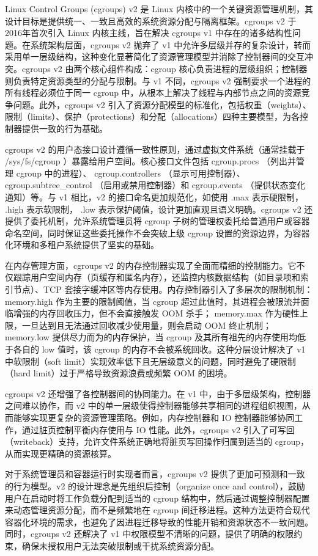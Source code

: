 Linux Control Groups (cgroups) v2 是 Linux 内核中的一个关键资源管理机制，其设计目标是提供统一、一致且高效的系统资源分配与隔离框架。cgroups v2 于2016年首次引入 Linux 内核主线，旨在解决 cgroups v1 中存在的诸多结构性问题。在系统架构层面，cgroups v2 抛弃了 v1 中允许多层级并存的复杂设计，转而采用单一层级结构，这种变化显著简化了资源管理模型并消除了控制器间的交互冲突。cgroups v2 由两个核心组件构成：cgroup 核心负责进程的层级组织；控制器则负责特定资源类型的分配与限制。与 v1 不同，cgroups v2 强制要求一个进程的所有线程必须位于同一 cgroup 中，从根本上解决了线程与内部节点之间的资源竞争问题。此外，cgroups v2 引入了资源分配模型的标准化，包括权重（weights）、限制（limits）、保护（protections）和分配（allocations）四种主要模型，为各控制器提供一致的行为基础。

cgroups v2 的用户态接口设计遵循一致性原则，通过虚拟文件系统（通常挂载于 /sys/fs/cgroup ）暴露给用户空间。核心接口文件包括 cgroup.procs （列出并管理 cgroup 中的进程）、 cgroup.controllers （显示可用控制器）、 cgroup.subtree\_control （启用或禁用控制器）和 cgroup.events （提供状态变化通知）等。与 v1 相比，v2 的接口命名更加规范化，如使用 .max 表示硬限制， .high 表示软限制， .low 表示保护阈值，设计更加直观且语义明确。cgroups v2 还提供了委托机制，允许系统管理员将 cgroup 子树的管理权委托给普通用户或容器命名空间，同时保证这些委托操作不会突破上级 cgroup 设置的资源边界，为容器化环境和多租户系统提供了坚实的基础。

在内存管理方面，cgroups v2 的内存控制器实现了全面而精细的控制能力。它不仅跟踪用户空间内存（页缓存和匿名内存），还监控内核数据结构（如目录项和索引节点）、TCP 套接字缓冲区等内存使用。内存控制器引入了多层次的限制机制： memory.high 作为主要的限制阈值，当 cgroup 超过此值时，其进程会被限流并面临增强的内存回收压力，但不会直接触发 OOM 杀手； memory.max 作为硬性上限，一旦达到且无法通过回收减少使用量，则会启动 OOM 终止机制； memory.low 提供尽力而为的内存保护，当 cgroup 及其所有祖先的内存使用均低于各自的 low 值时，该 cgroup 的内存不会被系统回收。这种分层设计解决了 v1 中软限制（soft limit）实现效率低下且无层级意义的问题，同时避免了硬限制（hard limit）过于严格导致资源浪费或频繁 OOM 的困境。

cgroups v2 还增强了各控制器间的协同能力。在 v1 中，由于多层级架构，控制器之间难以协作，而 v2 中的单一层级使得控制器能够共享相同的进程组织视图，从而能够实现更复杂的资源管理策略。例如，内存控制器和 IO 控制器能够协同工作，通过脏页控制平衡内存使用与 IO 性能。此外，cgroups v2 引入了可写回（writeback）支持，允许文件系统正确地将脏页写回操作归属到适当的 cgroup，从而实现更精确的资源核算。

对于系统管理员和容器运行时实现者而言，cgroups v2 提供了更加可预测和一致的行为模型。v2 的设计理念是先组织后控制（organize once and control），鼓励用户在启动时将工作负载分配到适当的 cgroup 结构中，然后通过调整控制器配置来动态管理资源分配，而不是频繁地在 cgroup 间迁移进程。这种方法更符合现代容器化环境的需求，也避免了因进程迁移导致的性能开销和资源状态不一致问题。同时，cgroups v2 还解决了 v1 中权限模型不清晰的问题，提供了明确的权限约束，确保未授权用户无法突破限制或干扰系统资源分配。


